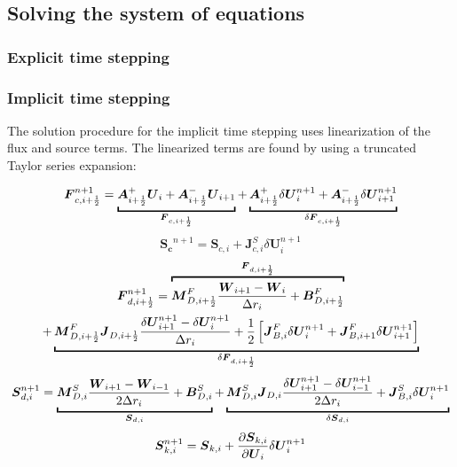 \documentclass[10pt]{article}
\begin{document}
\begin{flushleft}
\subsection{Solving the system of equations}

\subsubsection{Explicit time stepping}

\subsubsection{Implicit time stepping}

The solution procedure for the implicit time stepping uses linearization of the flux and source terms. The linearized terms are found by using a truncated Taylor series expansion:

\begin{equation*}
    \boldsymbol{F}_{c, i+\frac{1}{2}}^{n+1} = \ub{\boldsymbol{A}_{i+\frac{1}{2}}^+ \boldsymbol{U}_i + \boldsymbol{A}_{i+\frac{1}{2}}^- \boldsymbol{U}_{i+1}}{\boldsymbol{F}_{c, i + \frac{1}{2}}} + \ub{\boldsymbol{A}_{i+\frac{1}{2}}^+ \delta \boldsymbol{U}_i^{n+1} + \boldsymbol{A}_{i+\frac{1}{2}}^- \delta \boldsymbol{U}_{i+1}^{n+1}}{\delta \boldsymbol{F}_{c, i + \frac{1}{2}}}
\end{equation*}
\begin{equation}
    \boldsymbol{S_c}^{n+1} = \boldsymbol{S}_{c,i} + \boldsymbol{J}_{c,i}^S \delta \boldsymbol{U}_i^{n+1}
\end{equation}
\begin{multline*}
    \boldsymbol{F}_{d, i + \frac{1}{2}}^{n+1} = \ob{\boldsymbol{M}_{D, i + \frac{1}{2}}^F \frac{\boldsymbol{W}_{i+1} - \boldsymbol{W}_i}{\Delta r_i} + \boldsymbol{B}_{D, i + \frac{1}{2}}^F}{\boldsymbol{F}_{d, i + \frac{1}{2}}}
    \\ + \ub{\boldsymbol{M}_{D, i + \frac{1}{2}}^F \boldsymbol{J}_{D, i + \frac{1}{2}} \frac{\delta \boldsymbol{U}_{i+1}^{n+1} - \delta \boldsymbol{U}_i^{n+1}}{\Delta r_i} + \frac{1}{2} \bb{\boldsymbol{J}_{B, i}^F \delta \boldsymbol{U}_i^{n+1} + \boldsymbol{J}_{B, i+1}^F \delta \boldsymbol{U}_{i+1}^{n+1}}}{\delta \boldsymbol{F}_{d, i + \frac{1}{2}}}
\end{multline*}
\begin{equation*}
    \boldsymbol{S}_{d,i}^{n+1} =  \ub{\boldsymbol{M}_{D, i}^S \frac{\boldsymbol{W}_{i+1} - \boldsymbol{W}_{i-1}}{2 \Delta r_i} + \boldsymbol{B}_{D, i}^S}{\boldsymbol{S}_{d,i}} + \ub{\boldsymbol{M}_{D, i}^S \boldsymbol{J}_{D, i} \frac{\delta \boldsymbol{U}_{i+1}^{n+1} - \delta \boldsymbol{U}_{i-1}^{n+1}}{2 \Delta r_i} + \boldsymbol{J}_{B, i}^S \delta \boldsymbol{U}_i^{n+1}}{\delta \boldsymbol{S}_{d,i}}
\end{equation*}
\begin{equation*}
    \boldsymbol{S}_{k,i}^{n+1} = \boldsymbol{S}_{k,i} + \frac{\partial \boldsymbol{S}_{k,i}}{\partial \boldsymbol{U}_i} \delta \boldsymbol{U}_i^{n+1}
\end{equation*}


\end{flushleft}
\end{document}
